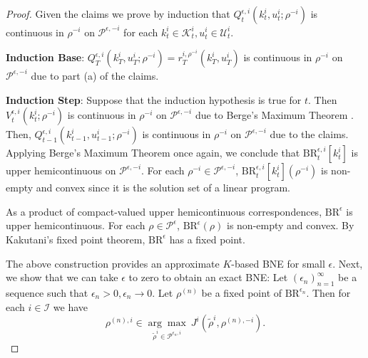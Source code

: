 \documentclass[pdflatex,sn-basic]{sn-jnl}
\newcommand{\Qfunc}{Q}
\newcommand{\comp}{k}
\newcommand{\Compset}{\mathcal{K}}
\theoremstyle{thmstyleone}%
\theoremstyle{thmstyletwo}%
\theoremstyle{thmstylethree}%
\begin{document}
\begin{appendices}
\begin{proof}
	Given the claims we prove by induction that $\Qfunc_t^{\epsilon, i}(\comp_t^i, u_{t}^i; \rho^{-i})$ is continuous in $\rho^{-i}$ on $\mathcal{P}^{\epsilon, -i}$ for each $\comp_t^i\in\Compset_t^i, u_t^i\in\mathcal{U}_t^i$.
	
	\textbf{Induction Base}: {$\Qfunc_T^{\epsilon, i}(\comp_T^i, u_{T}^i; \rho^{-i}) = r_T^{i, \rho^{-i}}(\comp_T^i, u_T^i)$ is continuous in $\rho^{-i}$ on $\mathcal{P}^{\epsilon, -i}$ due to part (a) of the claims.}
	
	\textbf{Induction Step}: Suppose that the induction hypothesis is true for $t$. Then $V_t^{\epsilon, i}(\comp_t^i; \rho^{-i})$ is continuous in $\rho^{-i}$ on $\mathcal{P}^{\epsilon, -i}$ due to Berge's Maximum Theorem \citep{sundaram1996first}. Then, $\Qfunc_{t-1}^{\epsilon, i}(\comp_{t-1}^i, u_{t-1}^i; \rho^{-i})$ is continuous in $\rho^{-i}$ on $\mathcal{P}^{\epsilon, -i}$ due to the claims.\\
	
	Applying Berge's Maximum Theorem \citep{sundaram1996first} once again, we conclude that $\mathrm{BR}_t^{\epsilon, i}[\comp_t^i]$ is upper hemicontinuous on $\mathcal{P}^{\epsilon, -i}$. For each $\rho^{-i} \in \mathcal{P}^{\epsilon, -i}$, $\mathrm{BR}_t^{\epsilon, i}[\comp_t^i](\rho^{-i})$ is non-empty and convex since it is the solution set of a linear program.
	
	As a product of compact-valued upper hemicontinuous correspondences, $\mathrm{BR}^\epsilon$ is upper hemicontinuous. For each $\rho \in \mathcal{P}^{\epsilon}$, $\mathrm{BR}^\epsilon(\rho)$ is non-empty and convex. By Kakutani's fixed point theorem, $\mathrm{BR}^\epsilon$ has a fixed point. 
 

    {The above construction provides an approximate $K$-based BNE for small $\epsilon$. Next, we show that we can take $\epsilon$ to zero to obtain an exact BNE:}
	Let $(\epsilon_n)_{n=1}^{\infty}$ be a sequence such that $\epsilon_n > 0, \epsilon_n\rightarrow 0$. Let $\rho^{(n)}$ be a fixed point of $\mathrm{BR}^{\epsilon_n}$. Then for each $i\in \mathcal{I}$ we have
	\begin{equation}
		\rho^{(n), i} \in \underset{\tilde{\rho}^i\in \mathcal{P}^{\epsilon_n, i}}{\arg\max}~J^i(\tilde{\rho}^i, \rho^{(n), -i}).
	\end{equation}
	

\end{proof}
\end{appendices}
\end{document}
